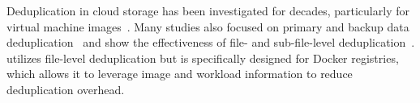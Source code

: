 %
%
%
%
%
%
%

Deduplication in cloud storage has been investigated for decades, particularly for virtual machine
images~\cite{zhou2013characterizing,srinivasan2012idedup,jin2009effectiveness, jayaram2011empirical}.
%
Many studies also focused on primary and backup data
deduplication~\cite{tarasov2014dmdedup,muthitacharoen2001low,lu2012insights,2009-sparse_indexing_inline_dedup_using_sampling-fast,2013-charact_increment_changes_data_protect-atc,wallace2012characteristics,zhu2008avoiding, lillibridge2013improving,
fu2014accelerating,fu2015design,fu2011aa}
and show the effectiveness of file- and sub-file-level
deduplication~\cite{2012-hpc_practical_dedup_study-sc,msst16dedup-study}.
%
\sysname utilizes file-level deduplication but is specifically designed for Docker registries,
which allows it to leverage image and workload information to reduce deduplication overhead.
%


